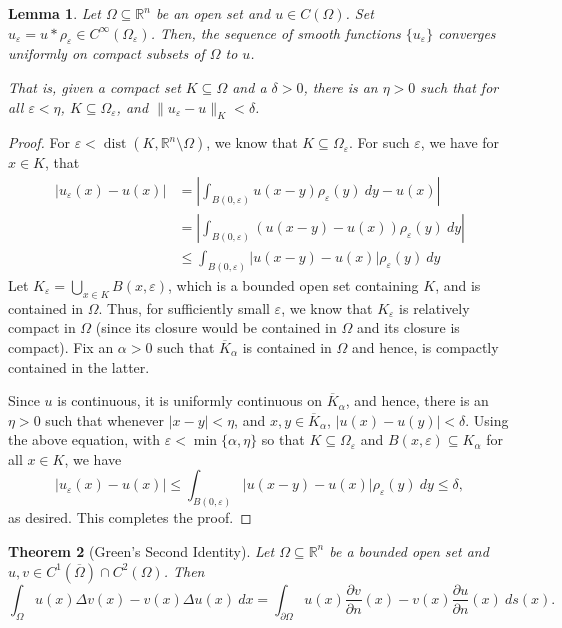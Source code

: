 \documentclass[10pt]{amsart}
\theoremstyle{thmstyle}
\newtheorem{theorem}{Theorem}[section]
\newtheorem{lemma}[theorem]{Lemma}
\theoremstyle{defstyle}
\newcommand{\R}{\mathbb{R}}
\renewcommand{\le}{\leqslant}
\newcommand{\dist}{\operatorname{dist}}
\begin{document}
\begin{lemma}
	Let $\Omega\subseteq\R^n$ be an open set and $u\in C(\Omega)$. Set $u_\varepsilon = u\ast\rho_\varepsilon\in C^\infty(\Omega_\varepsilon)$. Then, the sequence of smooth functions $\{u_\varepsilon\}$ converges uniformly on compact subsets of $\Omega$ to $u$. 
	
	That is, given a compact set $K\subseteq\Omega$ and a $\delta > 0$, there is an $\eta > 0$ such that for all $\varepsilon < \eta$, $K\subseteq\Omega_\varepsilon$, and $\|u_\varepsilon - u\|_{K} < \delta$.
\end{lemma}
\begin{proof}
	For $\varepsilon < \dist(K,\R^n\setminus\Omega)$, we know that $K\subseteq\Omega_\varepsilon$. For such $\varepsilon$, we have for $x\in K$, that 
	\begin{align*}
		|u_\varepsilon(x) - u(x)| &= \left|\int_{B(0,\varepsilon)}u(x - y)\rho_\varepsilon(y)~dy - u(x)\right|\\
		&= \left|\int_{B(0, \varepsilon)}\left(u(x - y) - u(x)\right)\rho_\varepsilon(y)~dy\right|\\
		&\le\int_{B(0,\varepsilon)}|u(x - y) - u(x)| \rho_\varepsilon(y)~dy
	\end{align*}
	Let $K_\varepsilon = \bigcup_{x\in K} B(x,\varepsilon)$, which is a bounded open set containing $K$, and is contained in $\Omega$. Thus, for sufficiently small $\varepsilon$, we know that $K_\varepsilon$ is relatively compact in $\Omega$ (since its closure would be contained in $\Omega$ and its closure is compact). Fix an $\alpha > 0$ such that $\overline K_\alpha$ is contained in $\Omega$ and hence, is compactly contained in the latter. 

	Since $u$ is continuous, it is uniformly continuous on $\overline K_\alpha$, and hence, there is an $\eta > 0$ such that whenever $|x - y| < \eta$, and $x,y\in\overline K_\alpha$, $|u(x) - u(y)| < \delta$. Using the above equation, with $\varepsilon < \min\{\alpha,\eta\}$ so that $K\subseteq\Omega_\varepsilon$ and $B(x,\varepsilon)\subseteq K_\alpha$ for all $x\in K$, we have 
	\begin{equation*}
		|u_\varepsilon(x) - u(x)|\le\int_{B(0,\varepsilon)}|u(x - y) - u(x)|\rho_\varepsilon(y)~dy\le\delta,
	\end{equation*}
	as desired. This completes the proof.
\end{proof}

\begin{theorem}[Green's Second Identity]
	Let $\Omega\subseteq\R^n$ be a bounded open set and $u, v\in C^1(\overline\Omega)\cap C^2(\Omega)$. Then 
	\begin{equation*}
		\int_{\Omega} u(x)\Delta v(x) - v(x)\Delta u(x)~dx = \int_{\partial\Omega} u(x)\frac{\partial v}{\partial n}(x) - v(x)\frac{\partial u}{\partial n}(x)~ds(x).
	\end{equation*}
\end{theorem}
\end{document}
